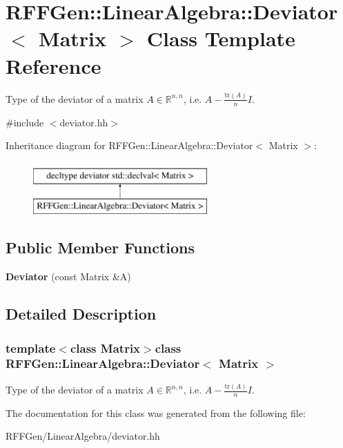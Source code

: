 \hypertarget{classRFFGen_1_1LinearAlgebra_1_1Deviator}{\section{R\-F\-F\-Gen\-:\-:Linear\-Algebra\-:\-:Deviator$<$ Matrix $>$ Class Template Reference}
\label{classRFFGen_1_1LinearAlgebra_1_1Deviator}
}


Type of the deviator of a matrix $ A\in\mathbb{R}^{n,n} $, i.\-e. $ A - \frac{\mathrm{tr}(A)}{n}I $.  




{\ttfamily \#include $<$deviator.\-hh$>$}

Inheritance diagram for R\-F\-F\-Gen\-:\-:Linear\-Algebra\-:\-:Deviator$<$ Matrix $>$\-:\begin{figure}[H]
\begin{center}
\leavevmode
\includegraphics[height=2.000000cm]{classRFFGen_1_1LinearAlgebra_1_1Deviator}
\end{center}
\end{figure}
\subsection*{Public Member Functions}
\begin{DoxyCompactItemize}
\item 
\hypertarget{classRFFGen_1_1LinearAlgebra_1_1Deviator_ac84edb60367e75063cb1c9fc5a5ee34a}{{\bfseries Deviator} (const Matrix \&A)}\label{classRFFGen_1_1LinearAlgebra_1_1Deviator_ac84edb60367e75063cb1c9fc5a5ee34a}

\end{DoxyCompactItemize}


\subsection{Detailed Description}
\subsubsection*{template$<$class Matrix$>$class R\-F\-F\-Gen\-::\-Linear\-Algebra\-::\-Deviator$<$ Matrix $>$}

Type of the deviator of a matrix $ A\in\mathbb{R}^{n,n} $, i.\-e. $ A - \frac{\mathrm{tr}(A)}{n}I $. 

The documentation for this class was generated from the following file\-:\begin{DoxyCompactItemize}
\item 
R\-F\-F\-Gen/\-Linear\-Algebra/deviator.\-hh\end{DoxyCompactItemize}
